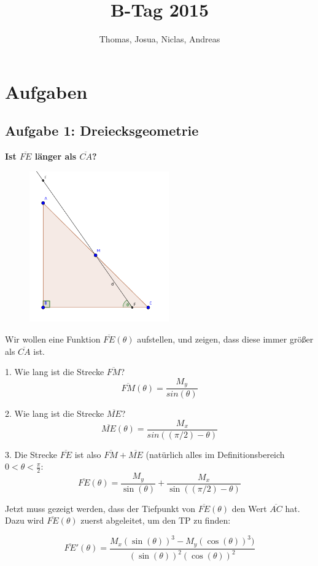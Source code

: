 \documentclass[a4paper,11pt]{article}
\title{B-Tag 2015}
\author{Thomas, Josua, Niclas, Andreas}
\begin{document}
\maketitle
\tableofcontents

\section{Aufgaben}
\subsection{Aufgabe 1: Dreiecksgeometrie}
\textbf{Ist $\overline{FE}$ länger als $\overline{CA}$?} \\

\begin{figure}[htbp] 
        \centering
        \includegraphics[width=6cm]{img/A1_1.png}
\end{figure}

Wir wollen eine Funktion $\overline{FE}(\theta)$ aufstellen, und zeigen, dass diese immer gr\"o\ss er als $\overline{CA}$ ist.

1. Wie lang ist die Strecke $\overline{FM}$?
\[ \overline{FM}(\theta) = \frac{M_y}{sin(\theta)} \]

2. Wie lang ist die Strecke $\overline{ME}$?
\[ \overline{ME}(\theta) = \frac{M_x}{sin((\pi/2)-\theta)} \]

3. Die Strecke $\overline{FE}$ ist also $\overline{FM} + \overline{ME}$ (natürlich alles im Definitionsbereich $0 < \theta < \frac{\pi}{2}$:
\[ \overline{FE}(\theta) = \frac{M_y}{\sin(\theta)} + \frac{M_x}{\sin((\pi/2)-\theta)} \]

Jetzt muss gezeigt werden, dass der Tiefpunkt von $\overline{FE}(\theta)$ den Wert $\overline{AC}$ hat. Dazu wird $\overline{FE}(\theta)$ zuerst abgeleitet, um den TP zu finden:

\[ \overline{FE}'(\theta) = \frac{M_x (\sin(\theta))^3 - M_y (\cos(\theta))^3)}{(\sin(\theta))^2 (\cos(\theta))^2} \]
\end{document}

